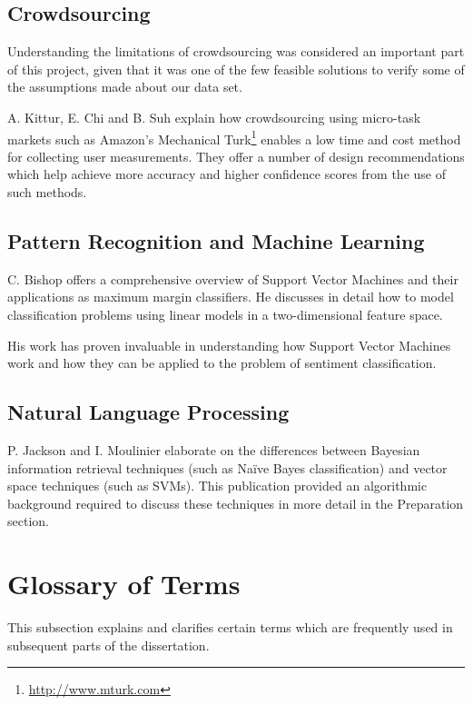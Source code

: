 \subsection{Crowdsourcing}

Understanding the limitations of crowdsourcing was considered an important part of this project, given that it was one of the few feasible solutions to verify some of the assumptions made about our data set.

A. Kittur, E. Chi and B. Suh \cite{Crowdsourcing} explain how crowdsourcing using micro-task markets such as Amazon's Mechanical Turk\footnote{\url{http://www.mturk.com}} enables a low time and cost method for collecting user measurements. They offer a number of design recommendations which help achieve more accuracy and higher confidence scores from the use of such methods.

\subsection{Pattern Recognition and Machine Learning}

C. Bishop offers a comprehensive overview of Support Vector Machines and their applications as maximum margin classifiers. He discusses in detail how to model classification problems using linear models in a two-dimensional feature space.

His work has proven invaluable in understanding how Support Vector Machines work and how they can be applied to the problem of sentiment classification.

\subsection{Natural Language Processing}

P. Jackson and I. Moulinier elaborate on the differences between Bayesian information retrieval techniques (such as Na\"ive Bayes classification) and vector space techniques (such as SVMs). This publication provided an algorithmic background required to discuss these techniques in more detail in the Preparation section.

\section{Glossary of Terms}

This subsection explains and clarifies certain terms which are frequently used in subsequent parts of the dissertation.

